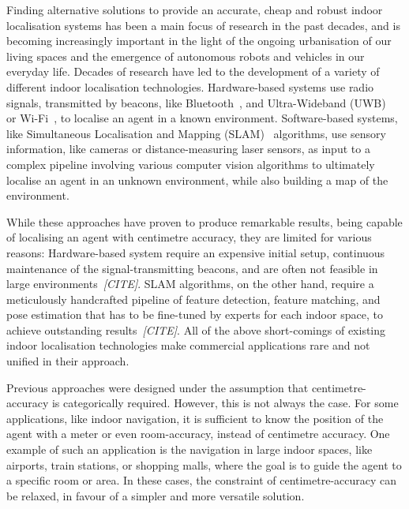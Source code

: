 \documentclass[a4paper]{article}
\begin{document}
Finding alternative solutions to provide an accurate, cheap and robust indoor
localisation systems has been a main focus of research in the past decades,
and is becoming increasingly important in the light of the ongoing
urbanisation of our living spaces and the emergence of autonomous robots and
vehicles in our everyday life. Decades of research have led to the development
of a variety of different indoor localisation technologies. Hardware-based
systems use radio signals, transmitted by beacons, like
Bluetooth~\cite{bluetooth1, bluetooth2}, and Ultra-Wideband (UWB)~\cite{uwb1,
uwb2} or Wi-Fi~\cite{survey1, survey2, wireless-positioning}, to localise an
agent in a known environment. Software-based systems, like Simultaneous
Localisation and Mapping (SLAM)~\cite{mono-slam, ptam, orb-slam} algorithms,
use sensory information, like cameras or distance-measuring laser sensors, as
input to a complex pipeline involving various computer vision algorithms to
ultimately localise an agent in an unknown environment, while also building a
map of the environment.

While these approaches have proven to produce remarkable results, being
capable of localising an agent with centimetre accuracy, they are limited for
various reasons: Hardware-based system require an expensive initial setup,
continuous maintenance of the signal-transmitting beacons, and are often not
feasible in large environments~\textit{[CITE]}. SLAM algorithms, on the other
hand, require a meticulously handcrafted pipeline of feature detection,
feature matching, and pose estimation that has to be fine-tuned by experts for
each indoor space, to achieve outstanding results~\textit{[CITE]}. All of the
above short-comings of existing indoor localisation technologies make
commercial applications rare and not unified in their approach. 

Previous approaches were designed under the assumption that
centimetre-accuracy is categorically required. However, this is not always the
case. For some applications, like indoor navigation, it is sufficient to know
the position of the agent with a meter or even room-accuracy, instead of
centimetre accuracy. One example of such an application is the navigation in
large indoor spaces, like airports, train stations, or shopping malls, where
the goal is to guide the agent to a specific room or area. In these cases, the
constraint of centimetre-accuracy can be relaxed, in favour of a simpler and
more versatile solution.
\end{document}
